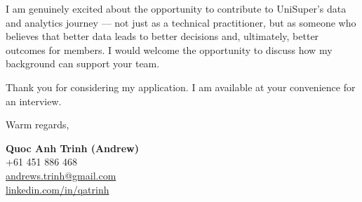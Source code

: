 \documentclass[11pt, a4paper]{article}
\begin{document}
I am genuinely excited about the opportunity to contribute to UniSuper's data and analytics journey --- not just as a technical practitioner, but as someone who believes that better data leads to better decisions and, ultimately, better outcomes for members. I would welcome the opportunity to discuss how my background can support your team.

Thank you for considering my application. I am available at your convenience for an interview.

\vspace{20pt}

Warm regards,

\vspace{30pt}

\textbf{Quoc Anh Trinh (Andrew)}\\
+61 451 886 468\\
\href{mailto:andrews.trinh@gmail.com}{andrews.trinh@gmail.com}\\
\href{https://www.linkedin.com/in/qatrinh}{linkedin.com/in/qatrinh}
\end{document}
